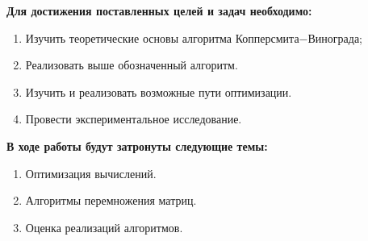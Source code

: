 \textbf{Для достижения поставленных целей и задач необходимо:}
\begin{enumerate}
    \item Изучить теоретические основы алгоритма Копперсмита$-$Винограда;
    \item Реализовать выше обозначенный алгоритм.
    \item Изучить и реализовать возможные пути оптимизации.
    \item Провести экспериментальное исследование.
\end{enumerate}

\textbf{В ходе работы будут затронуты следующие темы:}
\begin{enumerate}
\item Оптимизация вычислений.
\item Алгоритмы перемножения матриц.
\item Оценка реализаций алгоритмов.
\end{enumerate}
